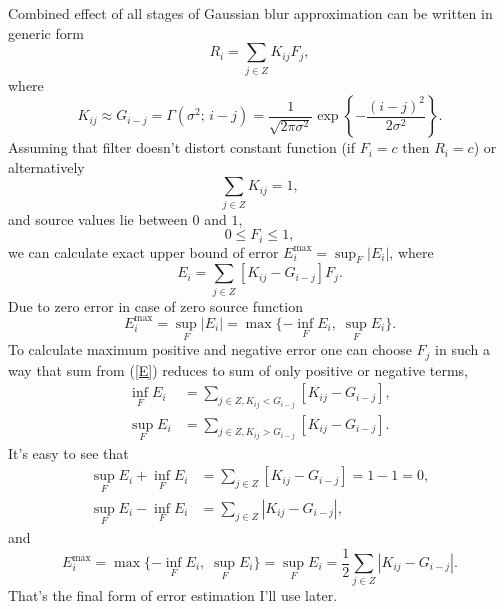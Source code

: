 \documentclass[10pt]{article}
\begin{document}
Combined effect of all stages of Gaussian blur approximation can be written in generic form
\begin{equation}
    R_i = \sum_{j\in Z} K_{ij}F_j,
\end{equation}
where
\begin{equation}
    K_{ij} \approx G_{i-j} = \Gamma(\sigma^2;\, i - j) =
        \frac1{\sqrt{2\pi\sigma^2}}\exp\left\{-\frac{(i - j)^2}{2\sigma^2}\right\}.
\end{equation}
Assuming that filter doesn't distort constant function (if $F_i = c$ then $R_i = c$) or
alternatively
\begin{equation}
    \sum_{j\in Z} K_{ij} = 1,
\end{equation}
and source values lie between $0$ and $1$,
\begin{equation}
    0 \le F_i \le 1,
\end{equation}
we can calculate exact upper bound of error $E^{\max}_i = \sup_F |E_i|$, where
\begin{equation}\label{E}
    E_i = \sum_{j\in Z} [K_{ij} - G_{i-j}]F_j.
\end{equation}
Due to zero error in case of zero source function
\begin{equation}
    E^{\max}_i = \sup_F |E_i| = \max\{-\inf_F E_i,\; \sup_F E_i\}.
\end{equation}
To calculate maximum positive and negative error one can choose $F_j$ in such a way that sum from
(\ref{E}) reduces to sum of only positive or negative terms,
\begin{align}
    \inf_F E_i &= \sum_{j\in Z, K_{ij} < G_{i-j}} [K_{ij} - G_{i-j}],\\
    \sup_F E_i &= \sum_{j\in Z, K_{ij} > G_{i-j}} [K_{ij} - G_{i-j}].
\end{align}
It's easy to see that
\begin{align}
    \sup_F E_i + \inf_F E_i &= \sum_{j\in Z} [K_{ij} - G_{i-j}] = 1 - 1 = 0,\\
    \sup_F E_i - \inf_F E_i &= \sum_{j\in Z} |K_{ij} - G_{i-j}|,
\end{align}
and
\begin{equation}
    E^{\max}_i = \max\{-\inf_F E_i,\; \sup_F E_i\} = \sup_F E_i =
        \frac12\sum_{j\in Z} |K_{ij} - G_{i-j}|.
\end{equation}
That's the final form of error estimation I'll use later.
\end{document}
